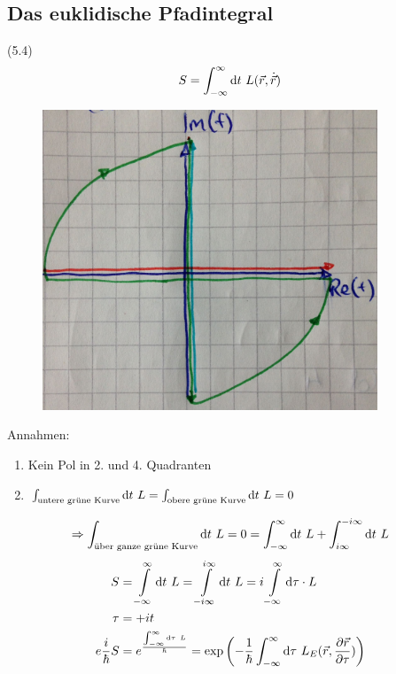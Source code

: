 \subsection{Das euklidische Pfadintegral} (5.4)
	\begin{align*}
		S= \int_{-\infty}^{\infty} \mathrm{d} t ~L(\vec{r}, \dot{\vec{r}})
	\end{align*}
			\begin{figure} [h]
			\begin{center}
				\includegraphics[width=10cm]{euklidisches_Pfradintegral1}
			\end{center}
			\end{figure} 
\FloatBarrier
Annahmen:
	\begin{enumerate}[(1)]
		\item Kein Pol in 2. und 4. Quadranten
		\item $\int_{\text{untere grüne Kurve}} \mathrm{d} t~L = \int_{\text{obere grüne Kurve}} \mathrm{d} t ~L = 0$
	\end{enumerate}
	\begin{align*}
	\Rightarrow \int_{\text{über ganze grüne Kurve}} \mathrm{d} t ~L = 0 = \int_{-\infty}^{\infty} \mathrm{d} t ~L + \int_{i\infty}^{-i\infty} \mathrm{d} t ~L
	\end{align*}	
	\begin{align*}
		S &= \int \limits_{-\infty}^{\infty} \mathrm{d} t ~L = \int \limits_{-i\infty}^{i\infty} \mathrm{d} t ~L = i \int \limits_{-\infty}^{\infty} \mathrm{d} \tau \cdot L \\
		\tau &= + it \\
		e{\frac{i}{\hbar} S} &= e^{\frac{\int_{-\infty}^{\infty}\mathrm{d} \tau ~L}{\hbar}} =
		\exp\left(-\frac{1}{\hbar} \int_{-\infty}^{\infty} \mathrm{d} \tau ~L_E(\vec{r}, \frac{\partial \vec{r}}{\partial \tau})\right)
	\end{align*}
